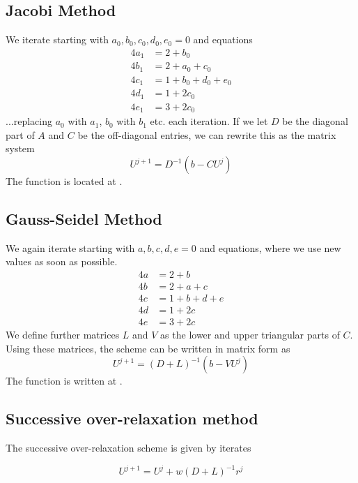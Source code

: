 \documentclass{article}
\numberwithin{equation}{section}
\theoremstyle{definition}
\begin{document}
\subsection{Jacobi Method}
We iterate starting with $a_0,b_0,c_0,d_0,e_0 = 0$ and equations
\begin{align}
    4a_1 &= 2 + b_0\\
    4b_1 &= 2 +a_0+c_0\\
    4c_1 &= 1 +b_0+d_0+e_0\\
    4d_1 &= 1+ 2c_0 \\
    4e_1 &= 3+2c_0
\end{align}
...replacing $a_0$ with $a_1$, $b_0$ with $b_1$ etc. each iteration.
If we let $D$ be the diagonal part of $A$ and $C$ be the off-diagonal entries, we can rewrite this as the matrix system
\begin{equation}
    U^{j+1} = D^{-1}(b - CU^j)
\end{equation}
The function is located at .


\subsection{Gauss-Seidel Method}
We again iterate starting with $a,b,c,d,e = 0$ and equations, where we use new values as soon as possible.
\begin{align}
    4a &= 2 + b\\
    4b &= 2 +a+c\\
    4c &= 1 +b+d+e\\
    4d &= 1+ 2c \\
    4e &= 3+2c
\end{align}
We define further matrices $L$ and $V$ as the lower and upper triangular parts of $C$. Using these matrices, the scheme can be written in matrix form as
\begin{equation}
    U^{j+1} = (D+L)^{-1}(b - VU^j)
\end{equation}
The function is written at .

\subsection{Successive over-relaxation method}
The successive over-relaxation scheme is given by iterates

\begin{equation}
    U^{j+1} = U^{j} + w (D + L)^{-1} r^j
\end{equation}
\end{document}
